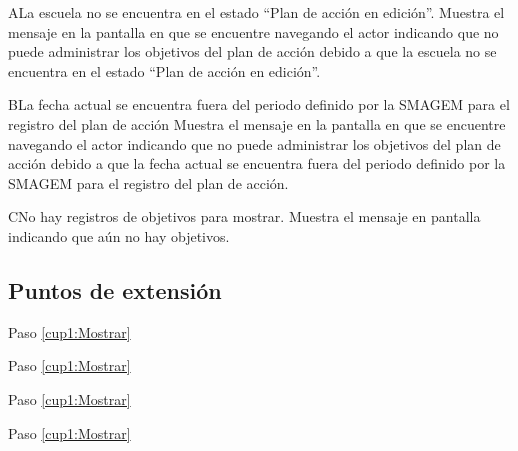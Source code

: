    \begin{UCtrayectoriaA}{A}{La escuela no se encuentra en el estado ``Plan de acción en edición''.}
    \UCpaso[\UCsist] Muestra el mensaje  en la pantalla en que se encuentre navegando el actor indicando que no puede administrar los objetivos del plan de acción debido a que la escuela no se encuentra en el estado ``Plan de acción en edición''. 
 \end{UCtrayectoriaA}
 
   \begin{UCtrayectoriaA}{B}{La fecha actual se encuentra fuera del periodo definido por la SMAGEM para el registro del plan de acción}
    \UCpaso[\UCsist] Muestra el mensaje  en la pantalla en que se encuentre navegando el actor indicando que no puede administrar los objetivos del plan de acción debido a que la fecha actual se encuentra fuera del periodo definido por la SMAGEM para el registro del plan de acción.
 \end{UCtrayectoriaA}
 
\begin{UCtrayectoriaA}{C}{No hay registros de objetivos para mostrar.}
    \UCpaso[\UCsist] Muestra el mensaje  en pantalla 
    indicando que aún no hay objetivos.
 \end{UCtrayectoriaA}
 

\subsection{Puntos de extensión}


      {Paso \ref{cup1:Mostrar}}
      {}
      
      {Paso \ref{cup1:Mostrar}}
      {}

      {Paso \ref{cup1:Mostrar}}
      {}
      
      {Paso \ref{cup1:Mostrar}}
      {}

